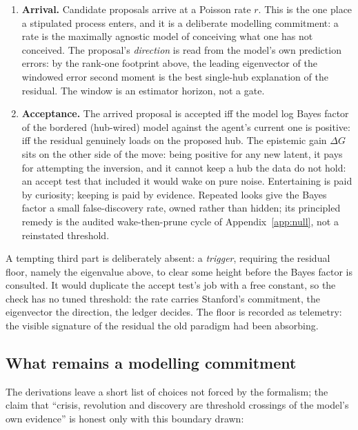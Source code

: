 \begin{enumerate}
\item \textbf{Arrival.} Candidate proposals arrive at a Poisson rate $r$. This is the one
place a stipulated process enters, and it is a deliberate modelling commitment: a rate is the
maximally agnostic model of conceiving what one has not conceived. The proposal's
\emph{direction} is read from the model's own prediction errors: by the rank-one footprint
above, the leading eigenvector of the windowed error second moment is the best single-hub
explanation of the residual. The window is an estimator horizon, not a gate.
\item \textbf{Acceptance.} The arrived proposal is accepted iff the model log Bayes factor of
the bordered (hub-wired) model against the agent's current one is positive: iff the residual
genuinely loads on the proposed hub. The epistemic gain $\Delta G$ sits on the other side of
the move: being positive for any new latent, it pays for attempting the
inversion, and it cannot keep a hub the data do not hold: an accept test that included it
would wake on pure noise. Entertaining is paid by curiosity; keeping is paid by evidence.
Repeated looks give the Bayes factor a small false-discovery rate, owned rather than hidden;
its principled remedy is the audited wake-then-prune cycle of Appendix~\ref{app:null}, not a
reinstated threshold.
\end{enumerate}

A tempting third part is deliberately absent: a \emph{trigger}, requiring the residual floor,
namely the eigenvalue above, to clear some height before the Bayes factor is consulted. It would
duplicate the accept test's job with a free constant, so the check has no tuned threshold:
the rate carries Stanford's commitment, the eigenvector the direction, the ledger decides.
The floor is recorded as telemetry: the visible signature of the residual the old paradigm
had been absorbing.

\subsection{What remains a modelling commitment}

The derivations leave a short list of choices not forced by the formalism; the claim that
``crisis, revolution and discovery are threshold crossings of the model's own evidence'' is
honest only with this boundary drawn:

